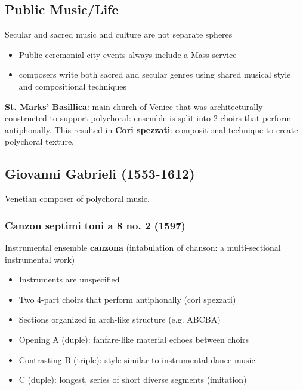\documentclass{article}
\begin{document}
  \subsection{Public Music/Life}
  Secular and sacred music and culture are not separate spheres
  \begin{itemize}
    \item Public ceremonial city events always include a Mass service
    \item composers write both sacred and secular genres using shared musical style and compositional techniques
  \end{itemize}
  \textbf{St. Marks' Basillica}: main church of Venice that was architecturally constructed to support polychoral: ensemble is split into 2 choirs that perform antiphonally. This resulted in \textbf{Cori spezzati}: compositional technique to create polychoral texture.
  \subsection{Giovanni Gabrieli (1553-1612)}
  Venetian composer of polychoral music.
  \subsubsection{Canzon septimi toni a 8 no. 2 (1597)}
  Instrumental ensemble \textbf{canzona} (intabulation of chanson: a multi-sectional instrumental work)
  \begin{itemize}
    \item Instruments are unspecified
    \item Two 4-part choirs that perform antiphonally (cori spezzati)
    \item Sections organized in arch-like structure (e.g. ABCBA)
    \item Opening A (duple): fanfare-like material echoes between choirs
    \item Contrasting B (triple): style similar to instrumental dance music
    \item C (duple): longest, series of short diverse segments (imitation)
  \end{itemize}
\end{document}
